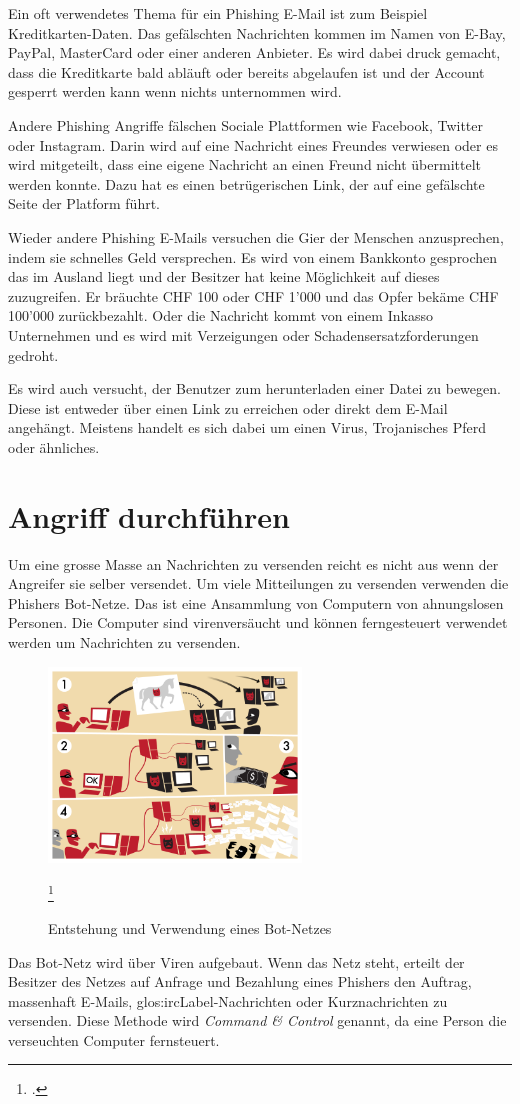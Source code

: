 Ein oft verwendetes Thema für ein Phishing E-Mail ist zum Beispiel Kreditkarten-Daten. Das gefälschten Nachrichten kommen im Namen von E-Bay, PayPal, MasterCard oder einer anderen Anbieter. Es wird dabei druck gemacht, dass die Kreditkarte bald abläuft oder bereits abgelaufen ist und der Account gesperrt werden kann wenn nichts unternommen wird. 

Andere Phishing Angriffe fälschen Sociale Plattformen wie Facebook, Twitter oder Instagram. Darin wird auf eine Nachricht eines Freundes verwiesen oder es wird mitgeteilt, dass eine eigene Nachricht an einen Freund nicht übermittelt werden konnte. Dazu hat es einen betrügerischen Link, der auf eine gefälschte Seite der Platform führt.

Wieder andere Phishing E-Mails versuchen die Gier der Menschen anzusprechen, indem sie schnelles Geld versprechen. Es wird von einem Bankkonto gesprochen das im Ausland liegt und der Besitzer hat keine Möglichkeit auf dieses zuzugreifen. Er bräuchte CHF 100 oder CHF 1'000 und das Opfer bekäme CHF 100'000 zurückbezahlt. Oder die Nachricht kommt von einem Inkasso Unternehmen und es wird mit Verzeigungen oder Schadensersatzforderungen gedroht.

Es wird auch versucht, der Benutzer zum herunterladen einer Datei zu bewegen. Diese ist entweder über einen Link zu erreichen oder direkt dem E-Mail angehängt. Meistens handelt es sich dabei um einen Virus, Trojanisches Pferd oder ähnliches. 

\section{Angriff durchführen}
Um eine grosse Masse an Nachrichten zu versenden reicht es nicht aus wenn der Angreifer sie selber versendet. Um viele Mitteilungen zu versenden verwenden die Phishers Bot-Netze. Das ist eine Ansammlung von Computern von ahnungslosen Personen. Die Computer sind virenversäucht und können ferngesteuert verwendet werden um Nachrichten zu versenden.
\begin{figure}[H]
  \centering
  \includegraphics[width=0.6\textwidth]{images/botnet.png}
  \caption{Entstehung und Verwendung eines Bot-Netzes}
  \footcite{Botnet__Wikipedia_2015-05-22}
  \label{fig:phishing:angriffdurchfueren:botnetz}
\end{figure}
Das Bot-Netz wird über Viren aufgebaut. Wenn das Netz steht, erteilt der Besitzer des Netzes auf Anfrage und Bezahlung eines Phishers den Auftrag, massenhaft E-Mails, \Gls{glos:ircLabel}-Nachrichten oder Kurznachrichten zu versenden. Diese Methode wird \textit{Command \& Control} genannt, da eine Person die verseuchten Computer fernsteuert.

